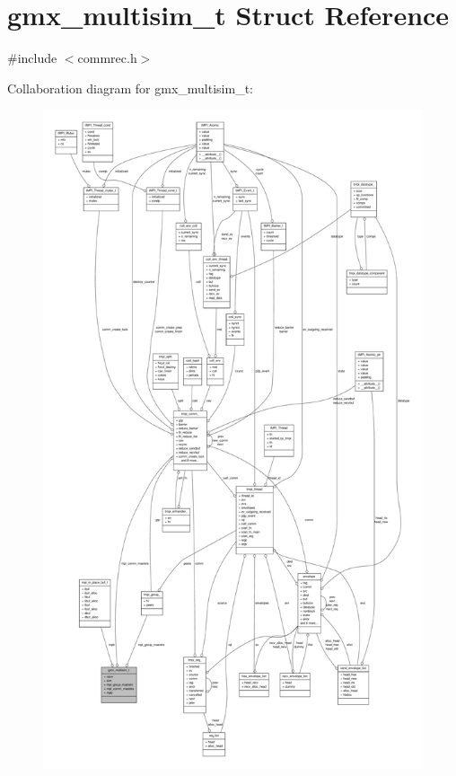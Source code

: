 \hypertarget{structgmx__multisim__t}{\section{gmx\-\_\-multisim\-\_\-t \-Struct \-Reference}
\label{structgmx__multisim__t}
}


{\ttfamily \#include $<$commrec.\-h$>$}



\-Collaboration diagram for gmx\-\_\-multisim\-\_\-t\-:
\nopagebreak
\begin{figure}[H]
\begin{center}
\leavevmode
\includegraphics[height=550pt]{structgmx__multisim__t__coll__graph}
\end{center}
\end{figure}
